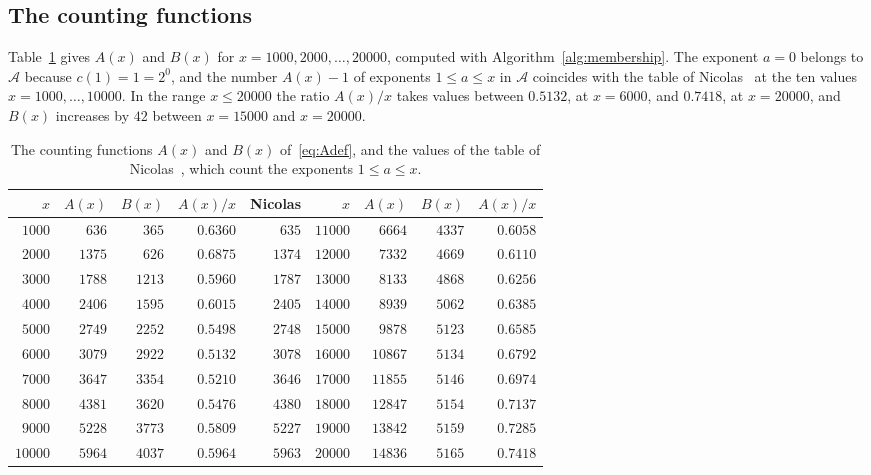 \documentclass[11pt]{amsart}
\theoremstyle{definition}
\begin{document}
\subsection{The counting functions}
\label{subsec:counting-exp}
Table~\ref{tab:counting} gives $A(x)$ and $B(x)$ for $x=1000,2000,\dots,20000$, computed with Algorithm~\ref{alg:membership}. The exponent $a=0$ belongs to $\mathcal{A}$ because $c(1)=1=2^0$, and the number $A(x)-1$ of exponents $1\le a\le x$ in $\mathcal{A}$ coincides with the table of Nicolas~\cite{nicolas2005open} at the ten values $x=1000,\dots,10000$. In the range $x\le20000$ the ratio $A(x)/x$ takes values between $0.5132$, at $x=6000$, and $0.7418$, at $x=20000$, and $B(x)$ increases by $42$ between $x=15000$ and $x=20000$.

\begin{table}[H]
\centering
\caption{The counting functions $A(x)$ and $B(x)$ of~\eqref{eq:Adef}, and the values of the table of Nicolas~\cite{nicolas2005open}, which count the exponents $1\le a\le x$.}
\label{tab:counting}
\begin{tabular}{rrrrr@{\qquad}rrrr}
\toprule
$x$ & $A(x)$ & $B(x)$ & $A(x)/x$ & Nicolas & $x$ & $A(x)$ & $B(x)$ & $A(x)/x$\\
\midrule
$1000$ & $636$ & $365$ & $0.6360$ & $635$ & $11000$ & $6664$ & $4337$ & $0.6058$\\
$2000$ & $1375$ & $626$ & $0.6875$ & $1374$ & $12000$ & $7332$ & $4669$ & $0.6110$\\
$3000$ & $1788$ & $1213$ & $0.5960$ & $1787$ & $13000$ & $8133$ & $4868$ & $0.6256$\\
$4000$ & $2406$ & $1595$ & $0.6015$ & $2405$ & $14000$ & $8939$ & $5062$ & $0.6385$\\
$5000$ & $2749$ & $2252$ & $0.5498$ & $2748$ & $15000$ & $9878$ & $5123$ & $0.6585$\\
$6000$ & $3079$ & $2922$ & $0.5132$ & $3078$ & $16000$ & $10867$ & $5134$ & $0.6792$\\
$7000$ & $3647$ & $3354$ & $0.5210$ & $3646$ & $17000$ & $11855$ & $5146$ & $0.6974$\\
$8000$ & $4381$ & $3620$ & $0.5476$ & $4380$ & $18000$ & $12847$ & $5154$ & $0.7137$\\
$9000$ & $5228$ & $3773$ & $0.5809$ & $5227$ & $19000$ & $13842$ & $5159$ & $0.7285$\\
$10000$ & $5964$ & $4037$ & $0.5964$ & $5963$ & $20000$ & $14836$ & $5165$ & $0.7418$\\
\bottomrule
\end{tabular}
\end{table}
\end{document}
